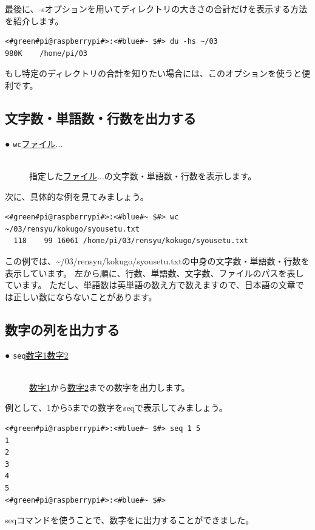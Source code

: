 \documentclass[text03.tex]{subfiles}
\begin{document}
最後に、-sオプションを用いてディレクトリの大きさの合計だけを表示する方法を紹介します。
\begin{lstlisting}[caption=du -hsの実行例, label=du_example]
<#green#pi@raspberrypi#>:<#blue#~ $#> du -hs ~/03
980K	/home/pi/03
\end{lstlisting}
もし特定のディレクトリの合計を知りたい場合には、このオプションを使うと便利です。

\subsection{文字数・単語数・行数を出力する}
\begin{description}
    \item[● \texttt{wc}\textvisiblespace \underline{ファイル}$\ldots$]\mbox{}\\
    指定した\underline{ファイル}$\ldots$の文字数・単語数・行数を表示します。
\end{description}
次に、具体的な例を見てみましょう。
\begin{lstlisting}[caption=wcコマンドの実行例, label=wc_example]
<#green#pi@raspberrypi#>:<#blue#~ $#> wc ~/03/rensyu/kokugo/syousetu.txt
  118    99 16061 /home/pi/03/rensyu/kokugo/syousetu.txt
\end{lstlisting}
この例では、\textasciitilde/03/rensyu/kokugo/syousetu.txtの中身の文字数・単語数・行数を表示しています。
左から順に、行数、単語数、文字数、ファイルのパスを表しています。
ただし、単語数は英単語の数え方で数えますので、日本語の文章では正しい数にならないことがあります。

\subsection{数字の列を出力する}
\begin{description}
    \item[● \texttt{seq}\textvisiblespace \underline{数字1}\textvisiblespace \underline{数字2}]\mbox{}\\
    \underline{数字1}から\underline{数字2}までの数字を出力します。
\end{description}
例として、1から5までの数字をseqで表示してみましょう。
\begin{lstlisting}[caption=seqコマンド]
<#green#pi@raspberrypi#>:<#blue#~ $#> seq 1 5
1
2
3
4
5
<#green#pi@raspberrypi#>:<#blue#~ $#>
\end{lstlisting}
seqコマンドを使うことで、数字をに出力することができました。
\end{document}
